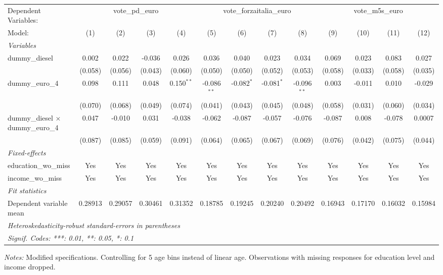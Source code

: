 
\begingroup
\centering
\begin{tabular}{lcccccccccccc}
   \tabularnewline \midrule \midrule
   Dependent Variables: & \multicolumn{4}{c}{vote\_pd\_euro} & \multicolumn{4}{c}{vote\_forzaitalia\_euro} & \multicolumn{4}{c}{vote\_m5s\_euro}\\
   Model:                                    & (1)     & (2)     & (3)     & (4)          & (5)           & (6)          & (7)          & (8)           & (9)     & (10)    & (11)    & (12)\\  
   \midrule
   \emph{Variables}\\
   dummy\_diesel                             & 0.002   & 0.022   & -0.036  & 0.026        & 0.036         & 0.040        & 0.023        & 0.034         & 0.069   & 0.023   & 0.083   & 0.027\\   
                                             & (0.058) & (0.056) & (0.043) & (0.060)      & (0.050)       & (0.050)      & (0.052)      & (0.053)       & (0.058) & (0.033) & (0.058) & (0.035)\\   
   dummy\_euro\_4                            & 0.098   & 0.111   & 0.048   & 0.150$^{**}$ & -0.086$^{**}$ & -0.082$^{*}$ & -0.081$^{*}$ & -0.096$^{**}$ & 0.003   & -0.011  & 0.010   & -0.029\\   
                                             & (0.070) & (0.068) & (0.049) & (0.074)      & (0.041)       & (0.043)      & (0.045)      & (0.048)       & (0.058) & (0.031) & (0.060) & (0.034)\\   
   dummy\_diesel $\times$ dummy\_euro\_4     & 0.047   & -0.010  & 0.031   & -0.038       & -0.062        & -0.087       & -0.057       & -0.076        & -0.087  & 0.008   & -0.078  & 0.0007\\   
                                             & (0.087) & (0.085) & (0.059) & (0.091)      & (0.064)       & (0.065)      & (0.067)      & (0.069)       & (0.076) & (0.042) & (0.075) & (0.044)\\   
   \midrule
   \emph{Fixed-effects}\\
   education\_wo\_miss                       & Yes     & Yes     & Yes     & Yes          & Yes           & Yes          & Yes          & Yes           & Yes     & Yes     & Yes     & Yes\\  
   income\_wo\_miss                          & Yes     & Yes     & Yes     & Yes          & Yes           & Yes          & Yes          & Yes           & Yes     & Yes     & Yes     & Yes\\  
   \midrule
   \emph{Fit statistics}\\
   Dependent variable mean                   & 0.28913 & 0.29057 & 0.30461 & 0.31352      & 0.18785       & 0.19245      & 0.20240      & 0.20492       & 0.16943 & 0.17170 & 0.16032 & 0.15984\\  
   \midrule \midrule
   \multicolumn{13}{l}{\emph{Heteroskedasticity-robust standard-errors in parentheses}}\\
   \multicolumn{13}{l}{\emph{Signif. Codes: ***: 0.01, **: 0.05, *: 0.1}}\\
\end{tabular}
 
\par \raggedright 
\textit{Notes:} Modified specifications. Controlling for 5 age bins instead of linear age. Observations with missing responses for education level and income dropped.
\par\endgroup


